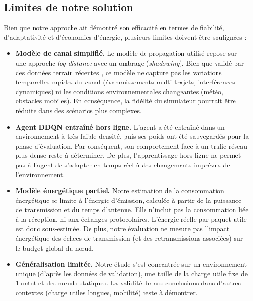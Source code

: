 \subsection{Limites de notre solution}

Bien que notre approche ait démontré son efficacité en termes de fiabilité, d'adaptativité et d'économies d'énergie, plusieurs limites doivent être soulignées :

\begin{itemize}
	\item \textbf{Modèle de canal simplifié.} Le modèle de propagation utilisé repose sur une approche \textit{log-distance} avec un ombrage (\textit{shadowing}). Bien que validé par des données terrain récentes \cite{lrfhss_comparaison}, ce modèle ne capture pas les variations temporelles rapides du canal (évanouissements multi-trajets, interférences dynamiques) ni les conditions environnementales changeantes (météo, obstacles mobiles). En conséquence, la fidélité du simulateur pourrait être réduite dans des scénarios plus complexes.
	
	\item \textbf{Agent DDQN entraîné hors ligne.} L’agent a été entraîné dans un environnement à très faible densité, puis ses poids ont été sauvegardés pour la phase d'évaluation. Par conséquent, son comportement face à un trafic réseau plus dense reste à déterminer. De plus, l'apprentissage hors ligne ne permet pas à l'agent de s'adapter en temps réel à des changements imprévus de l'environnement.
	
	\item \textbf{Modèle énergétique partiel.} Notre estimation de la consommation énergétique se limite à l'énergie d'émission, calculée à partir de la puissance de transmission et du temps d'antenne. Elle n'inclut pas la consommation liée à la réception, ni aux échanges protocolaires. L'énergie réelle par paquet utile est donc sous-estimée. De plus, notre évaluation ne mesure pas l'impact énergétique des échecs de transmission (et des retransmissions associées) sur le budget global du nœud.
	
	\item \textbf{Généralisation limitée.} Notre étude s'est concentrée sur un environnement unique (d'après les données de validation), une taille de la charge utile fixe de 1 octet et des nœuds statiques. La validité de nos conclusions dans d'autres contextes (charge utiles longues, mobilité) reste à démontrer.
\end{itemize}



